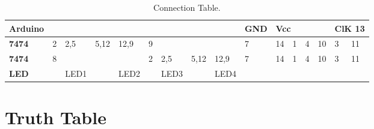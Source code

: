 \documentclass[journal,12pt,twocolumn]{IEEEtran}
\begin{document}
\newpage




\begin{table}[h]
\large
\centering

\begin{tabular}{|l|l|l|l|l|l|l|l|l|l|llll|ll|}
\hline
\textbf{Arduino} &   &      &      &      &   &      &      &      & GND & \multicolumn{4}{l|}{Vcc}                                                       & \multicolumn{2}{l|}{ClK  13} \\ \hline
\textbf{7474}    & 2 & 2,5  & 5,12 & 12,9 & 9 &      &      &      & 7   & \multicolumn{1}{l|}{14} & \multicolumn{1}{l|}{1} & \multicolumn{1}{l|}{4} & 10 & \multicolumn{1}{l|}{3}  & 11 \\ \hline
\textbf{7474}    & 8 &      &      &      & 2 & 2,5  & 5,12 & 12,9 & 7   & \multicolumn{1}{l|}{14} & \multicolumn{1}{l|}{1} & \multicolumn{1}{l|}{4} & 10 & \multicolumn{1}{l|}{3}  & 11 \\ \hline
\textbf{LED}     &   & LED1 &      & LED2 &   & LED3 &      & LED4 &     & \multicolumn{1}{l|}{}   & \multicolumn{1}{l|}{}  & \multicolumn{1}{l|}{}  &    & \multicolumn{1}{l|}{}   &    \\ \hline
\end{tabular}

\caption{Connection Table.}
\label{table:1}
\end{table}


\section{Truth Table}
\end{document}

